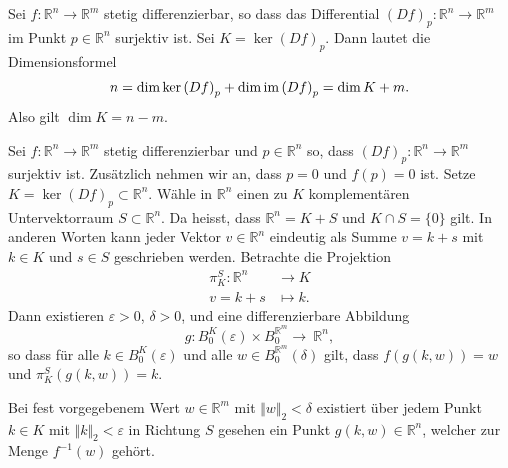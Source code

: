 \documentclass[../main.tex]{subfiles}
\begin{document}
Sei $f \colon \mathbb{R}^n \to \mathbb{R}^m$ 
stetig differenzierbar, so dass das Differential
${(Df)}_p \colon \mathbb{R}^n \to \mathbb{R}^m$
im Punkt $p \in \mathbb{R}^n$ surjektiv ist.
Sei $K = \ker {(Df)}_p$.
Dann lautet die Dimensionsformel
\[
  n = \dim \ker {(Df)}_p + \dim \operatorname{im} {(Df)}_p
  = \dim K + m.
\]
Also gilt $\dim K = n-m$.

\begin{theorem}%
  \label{thm:implicit}
  Sei $f \colon \mathbb{R}^n \to \mathbb{R}^m$ stetig differenzierbar
  und $p \in \mathbb{R}^n$ so, dass ${(Df)}_p \colon \mathbb{R}^n
  \to \mathbb{R}^m$ surjektiv ist.
  Zusätzlich nehmen wir an, dass $p = 0$ und $f(p) = 0$ ist.
  Setze $K = \ker {(Df)}_p \subset \mathbb{R}^n$.
  Wähle in $\mathbb{R}^n$ einen zu $K$ komplementären
  Untervektorraum $S \subset \mathbb{R}^n$.
  Da heisst, dass $\mathbb{R}^n = K + S$ und
  $K \cap S = \{0\}$ gilt.
  In anderen Worten kann jeder Vektor $v \in \mathbb{R}^n$ 
  eindeutig als Summe $v = k + s$ mit $k \in K$ 
  und $s \in S$ geschrieben werden.
  Betrachte die Projektion
  \begin{align*}
    \pi_K^S \colon \mathbb{R}^n & \to K \\
     v = k + s & \mapsto k.
  \end{align*}
  Dann existieren $\varepsilon > 0$,
  $\delta > 0$,
  und eine differenzierbare Abbildung
  \[
    g \colon B_0^K (\varepsilon) \times B_0^{\mathbb{R}^m}
    \to~\mathbb{R}^n,
  \]
  so dass für alle $k \in B_0^K(\varepsilon)$ 
  und alle $w \in B_0^{\mathbb{R}^m}(\delta)$
  gilt, dass $f(g(k, w)) = w$ 
  und $\pi_K^S(g(k, w)) = k$.
\end{theorem}

\begin{geometric}
  Bei fest vorgegebenem Wert $w \in \mathbb{R}^m$ 
  mit $\Vert w \Vert_2 < \delta$ 
  existiert über jedem Punkt $k \in K$ 
  mit $\Vert k \Vert_2 < \varepsilon$ 
  in Richtung $S$ gesehen ein
  Punkt $g(k, w) \in \mathbb{R}^n$,
  welcher zur Menge $f^{-1}(w)$ gehört.
\end{geometric}
\end{document}
